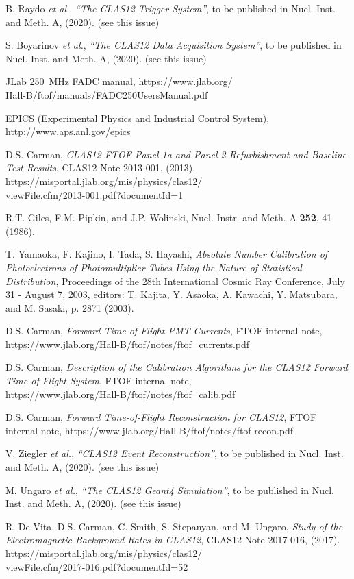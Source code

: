 \documentclass[final,3p,twocolumn]{elsarticle}
\begin{document}
\begin{thebibliography}{99}
B. Raydo {\it et al.}, {\it ``The CLAS12 Trigger System''}, to be published in Nucl. Inst. and Meth. A, (2020).
(see this issue)
  
S. Boyarinov {\it et al.}, {\it ``The CLAS12 Data Acquisition System''}, to be published in Nucl. Inst. and
Meth. A, (2020). (see this issue)

JLab 250~MHz FADC manual, https://www.jlab.org/\\ Hall-B/ftof/manuals/FADC250UsersManual.pdf
  
EPICS (Experimental Physics and Industrial Control System),\\ http://www.aps.anl.gov/epics

D.S. Carman, {\it CLAS12 FTOF Panel-1a and Panel-2 Refurbishment and Baseline Test Results},
CLAS12-Note 2013-001, (2013).\\
https://misportal.jlab.org/mis/physics/clas12/\\ viewFile.cfm/2013-001.pdf?documentId=1

R.T. Giles, F.M. Pipkin, and J.P. Wolinski, Nucl. Instr. and Meth. A {\bf 252}, 41 (1986).

T. Yamaoka, F. Kajino, I. Tada, S. Hayashi, {\it Absolute Number Calibration of Photoelectrons of
Photomultiplier Tubes Using the Nature of Statistical Distribution}, Proceedings of the 28th International
Cosmic Ray Conference, July 31 - August 7, 2003, editors: T. Kajita, Y. Asaoka, A. Kawachi, Y. Matsubara, and
M. Sasaki, p. 2871 (2003).

D.S. Carman, {\it Forward Time-of-Flight PMT Currents}, FTOF internal note, 
https://www.jlab.org/Hall-B/ftof/notes/ftof\_currents.pdf

D.S. Carman, {\it Description of the Calibration Algorithms for the CLAS12 Forward Time-of-Flight System},
FTOF internal note, \\
https://www.jlab.org/Hall-B/ftof/notes/ftof\_calib.pdf

D.S. Carman, {\it Forward Time-of-Flight Reconstruction for CLAS12}, FTOF internal note, 
https://www.jlab.org/Hall-B/ftof/notes/ftof-recon.pdf

V. Ziegler {\it et al.}, {\it ``CLAS12 Event Reconstruction''}, to be published in Nucl. Inst.
and Meth. A, (2020). (see this issue)

M. Ungaro {\it et al.}, {\it ``The CLAS12 Geant4 Simulation''}, to be published in Nucl. Inst.
and Meth. A, (2020). (see this issue)

R. De Vita, D.S. Carman, C. Smith, S. Stepanyan, and M. Ungaro, {\it Study of the Electromagnetic Background
Rates in CLAS12}, CLAS12-Note 2017-016, (2017).\\
https://misportal.jlab.org/mis/physics/clas12/\\ viewFile.cfm/2017-016.pdf?documentId=52

\end{thebibliography}
\end{document}
